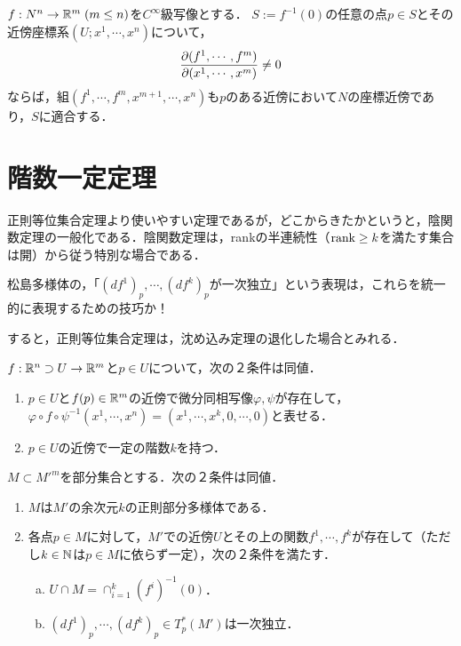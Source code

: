 \documentclass[uplatex,dvipdfmx]{jsreport}
\begin{document}
\begin{lemma}[正則等位集合定理の証明抽出]
    $f:N^n\to\mathbb{R}^m\;(m\le n)$を$C^\infty$級写像とする．
    $S:=f^{-1}(0)$の任意の点$p\in S$とその近傍座標系$(U;x^1,\cdots,x^n)$について，
    \[\frac{\partial (f^1,\cdots,f^m)}{\partial (x^1,\cdots,x^m)}\ne 0\]
    ならば，組$(f^1,\cdots,f^m,x^{m+1},\cdots,x^n)$も$p$のある近傍において$N$の座標近傍であり，$S$に適合する．
\end{lemma}

\section{階数一定定理}

\begin{tcolorbox}[colframe=ForestGreen, colback=ForestGreen!10!white,breakable,colbacktitle=ForestGreen!40!white,coltitle=black,fonttitle=\bfseries\sffamily,
title=]
    正則等位集合定理より使いやすい定理であるが，どこからきたかというと，陰関数定理の一般化である．陰関数定理は，rankの半連続性（$\mathrm{rank}\ge k$を満たす集合は開）から従う特別な場合である．

    松島多様体の，「$(df^1)_p,\cdots,(df^k)_p$が一次独立」という表現は，これらを統一的に表現するための技巧か！

    すると，正則等位集合定理は，沈め込み定理の退化した場合とみれる．
\end{tcolorbox}

\begin{theorem}[階数一定定理]
    $f:\mathbb{R}^n\supset U\to\mathbb{R}^m$と$p\in U$について，次の２条件は同値．
    \begin{enumerate}
        \item $p\in U$と$f(p)\in\mathbb{R}^m$の近傍で微分同相写像$\varphi,\psi$が存在して，$\varphi\circ f\circ\psi^{-1}(x^1,\cdots,x^n)=(x^1,\cdots,x^k,0,\cdots,0)$と表せる．
        \item $p\in U$の近傍で一定の階数$k$を持つ．
    \end{enumerate}
\end{theorem}

\begin{theorem}[正則部分多様体の特徴付け(松島)]
    $M\subset M'^m$を部分集合とする．次の２条件は同値．
    \begin{enumerate}
        \item $M$は$M'$の余次元$k$の正則部分多様体である．
        \item 各点$p\in M$に対して，$M'$での近傍$U$とその上の関数$f^1,\cdots,f^k$が存在して（ただし$k\in\mathbb{N}$は$p\in M$に依らず一定），次の２条件を満たす．
        \begin{enumerate}[(a)]
            \item $U\cap M=\cap_{i=1}^k(f^i)^{-1}(0)$．
            \item $(df^1)_p,\cdots,(df^k)_p\in T^*_p(M')$は一次独立．
        \end{enumerate}
    \end{enumerate}
\end{theorem}
\end{document}
